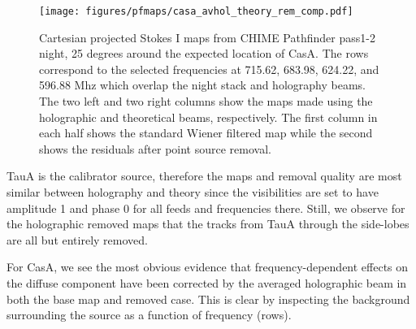 \begin{figure}
\centering
\texttt{[image: figures/pfmaps/casa\_avhol\_theory\_rem\_comp.pdf]}
\caption{Cartesian projected Stokes I maps from CHIME Pathfinder pass1-2 night, 25 degrees around the expected location of CasA. The rows correspond to the selected frequencies at 715.62, 683.98, 624.22, and 596.88 Mhz which overlap the night stack and holography beams. The two left and two right columns show the maps made using the holographic and theoretical beams, respectively. The first column in each half shows the standard Wiener filtered map while the second shows the residuals after point source removal.}
\label{casa_comparison}
\end{figure}

TauA is the calibrator source, therefore the maps and removal quality are most similar between holography and theory since the visibilities are set to have amplitude 1 and phase 0 for all feeds and frequencies there. Still, we observe for the holographic removed maps that the tracks from TauA through the side-lobes are all but entirely removed.

For CasA, we see the most obvious evidence that frequency-dependent effects on the diffuse component have been corrected by the averaged holographic beam in both the base map and removed case. This is clear by inspecting the background surrounding the source as a function of frequency (rows).
